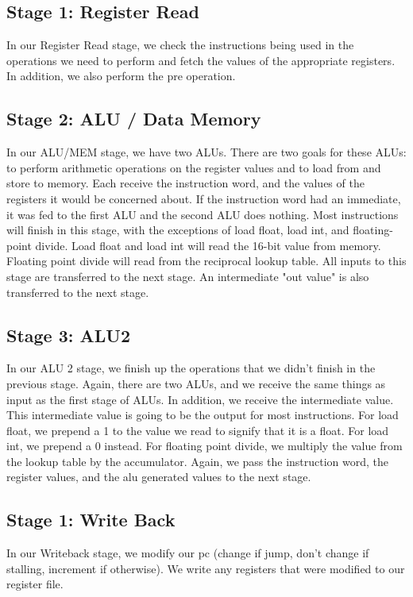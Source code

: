 \documentclass[sigconf]{acmart}
\begin{document}
\subsection{Stage 1: Register Read}
In our Register Read stage, we check the instructions being used in the operations we need to perform and fetch the values of the appropriate registers. In addition, we also perform the pre operation.

\subsection{Stage 2: ALU / Data Memory}
In our ALU/MEM stage, we have two ALUs. There are two goals for these ALUs: to perform arithmetic operations on the register values and to load from and store to memory. Each receive the instruction word, and the values of the registers it would be concerned about. If the instruction word had an immediate, it was fed to the first ALU and the second ALU does nothing. Most instructions will finish in this stage, with the exceptions of load float, load int, and floating-point divide. Load float and load int will read the 16-bit value from memory. Floating point divide will read from the reciprocal lookup table. All inputs to this stage are transferred to the next stage. An intermediate "out value" is also transferred to the next stage.

\subsection{Stage 3: ALU2}
In our ALU 2 stage, we finish up the operations that we didn’t finish in the previous stage. Again, there are two ALUs, and we receive the same things as input as the first stage of ALUs. In addition, we receive the intermediate value. This intermediate value is going to be the output for most instructions. For load float, we prepend a 1 to the value we read to signify that it is a float. For load int, we prepend a 0 instead. For floating point divide, we multiply the value from the lookup table by the accumulator. Again, we pass the instruction word, the register values, and the alu generated values to the next stage.

\subsection{Stage 1: Write Back}
In our Writeback stage, we modify our pc (change if jump, don’t change if stalling, increment if otherwise). We write any registers that were modified to our register file.
\end{document}

